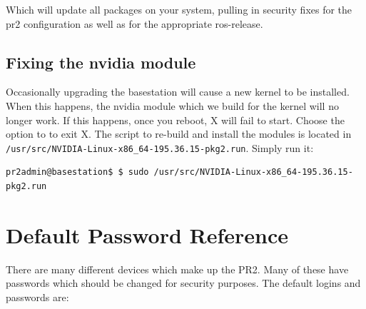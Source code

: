 Which will update all packages on your system, pulling in security fixes for
the pr2 configuration as well as for the appropriate ros-release.

\subsection{Fixing the nvidia module}

Occasionally upgrading the basestation will cause a new kernel to be
installed. When this happens, the nvidia module which we build for the
kernel will no longer work.  If this happens, once you reboot, X will
fail to start.  Choose the option to to exit X.  The script to
re-build and install the modules is located in
\texttt{/usr/src/NVIDIA-Linux-x86\_64-195.36.15-pkg2.run}.  Simply run it:

\begin{verbatim}
pr2admin@basestation$ $ sudo /usr/src/NVIDIA-Linux-x86_64-195.36.15-pkg2.run 
\end{verbatim}



\section{Default Password Reference}
There are many different devices which make up the PR2.  Many of these
have passwords which should be changed for security purposes.  The
default logins and passwords are:

